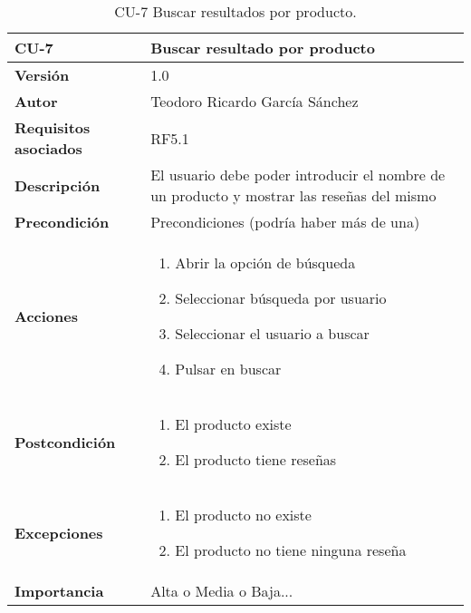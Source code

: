 \begin{table}[p]
	\centering
	\begin{tabularx}{\linewidth}{ p{} p{} }
		\toprule
		\textbf{CU-7}    & \textbf{Buscar resultado por producto}\\
		\toprule
		\textbf{Versión}              & 1.0    \\
		\textbf{Autor}                & Teodoro Ricardo García Sánchez \\
		\textbf{Requisitos asociados} & RF5.1 \\
		\textbf{Descripción}          & El usuario debe poder introducir el nombre de un producto y mostrar las reseñas del mismo \\
		\textbf{Precondición}         & Precondiciones (podría haber más de una) \\
		\textbf{Acciones}             &
		\begin{enumerate}
			\def\labelenumi{\arabic{enumi}.}
			\tightlist
			\item Abrir la opción de búsqueda
			\item Seleccionar búsqueda por usuario
			\item Seleccionar el usuario a buscar
			\item Pulsar en buscar
		\end{enumerate}\\
		\textbf{Postcondición}        & 
		\begin{enumerate}
			\item El producto existe
			\item El producto tiene reseñas 
		\end{enumerate} \\
		\textbf{Excepciones}          & 
		\begin{enumerate}
			\item El producto no existe
			\item El producto no tiene ninguna reseña 
		\end{enumerate} \\
		\textbf{Importancia}          & Alta o Media o Baja... \\
		\bottomrule
	\end{tabularx}
	\caption{CU-7 Buscar resultados por producto.}
\end{table}
